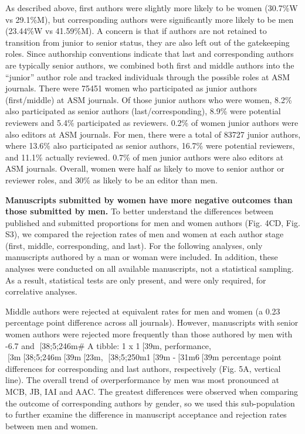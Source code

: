 \documentclass[11pt,]{article}
\begin{document}
As described above, first authors were slightly more likely to be women
(30.7\%W vs 29.1\%M), but corresponding authors were significantly more
likely to be men (23.44\%W vs 41.59\%M). A concern is that if authors
are not retained to transition from junior to senior status, they are
also left out of the gatekeeping roles. Since authorship conventions
indicate that last and corresponding authors are typically senior
authors, we combined both first and middle authors into the ``junior''
author role and tracked individuals through the possible roles at ASM
journals. There were 75451 women who participated as junior authors
(first/middle) at ASM journals. Of those junior authors who were women,
8.2\% also participated as senior authors (last/corresponding), 8.9\%
were potential reviewers and 5.4\% participated as reviewers. 0.2\% of
women junior authors were also editors at ASM journals. For men, there
were a total of 83727 junior authors, where 13.6\% also participated as
senior authors, 16.7\% were potential reviewers, and 11.1\% actually
reviewed. 0.7\% of men junior authors were also editors at ASM journals.
Overall, women were half as likely to move to senior author or reviewer
roles, and 30\% as likely to be an editor than men.

\textbf{Manuscripts submitted by women have more negative outcomes than
those submitted by men.} To better understand the differences between
published and submitted proportions for men and women authors (Fig. 4CD,
Fig. S3), we compared the rejection rates of men and women at each
author stage (first, middle, corresponding, and last). For the following
analyses, only manuscripts authored by a man or woman were included. In
addition, these analyses were conducted on all available manuscripts,
not a statistical sampling. As a result, statistical tests are only
present, and were only required, for correlative analyses.

Middle authors were rejected at equivalent rates for men and women (a
0.23 percentage point difference across all journals). However,
manuscripts with senior women authors were rejected more frequently than
those authored by men with -6.7 and {[}38;5;246m\# A tibble: 1 x
1{[}39m, performance, {[}3m{[}38;5;246m{[}39m{[}23m,
{[}38;5;250m1{[}39m -{[}31m6{[}39m percentage point differences for
corresponding and last authors, respectively (Fig. 5A, vertical line).
The overall trend of overperformance by men was most pronounced at MCB,
JB, IAI and AAC. The greatest differences were observed when comparing
the outcome of corresponding authors by gender, so we used this
sub-population to further examine the difference in manuscript
acceptance and rejection rates between men and women.
\end{document}
